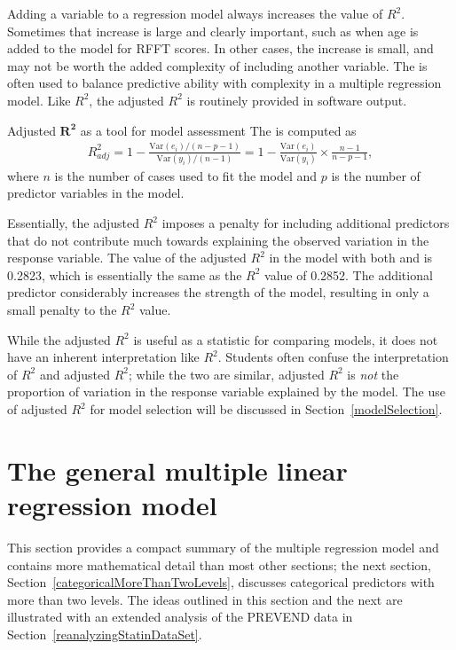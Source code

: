 Adding a variable to a regression model always increases the value of $R^2$. Sometimes that increase is large and clearly important, such as when age is added to the model for RFFT scores. In other cases, the increase is small, and may not be worth the added complexity of including another variable. The  is often used to balance predictive ability with complexity in a multiple regression model. Like $R^2$, the adjusted $R^2$ is routinely provided in software output. 

\begin{onebox}{Adjusted $\mathbf{R^2}$ as a tool for model assessment}
The  is computed as
\begin{align*}
R_{adj}^{2} = 1-\frac{\text{Var}(e_i) / (n-p-1)}{\text{Var}(y_i) / (n-1)}
	= 1-\frac{\text{Var}(e_i)}{\text{Var}(y_i)} \times
    \frac{n-1}{n-p-1},
\end{align*}
where $n$ is the number of cases used to fit the model and $p$ is the number of predictor variables in the model.
\end{onebox}

Essentially, the adjusted $R^2$ imposes a penalty for including additional predictors that do not contribute much towards explaining the observed variation in the response variable. The value of the adjusted $R^2$ in the model with both  and  is 0.2823, which is essentially the same as the $R^2$ value of 0.2852. The additional predictor  considerably increases the strength of the model, resulting in only a small penalty to the $R^2$ value.

While the adjusted $R^2$ is useful as a statistic for comparing models, it does not have an inherent interpretation like $R^2$. Students often confuse the interpretation of $R^2$ and adjusted $R^2$; while the two are similar, adjusted $R^2$ is \emph{not} the proportion of variation in the response variable explained by the model. The use of adjusted $R^2$ for model selection will be discussed in Section~\ref{modelSelection}.


\section{The general multiple linear regression model}
\label{generalMultipleRegression}
 
This section provides a compact summary of the multiple regression model and contains more mathematical detail than most other sections; the next section, Section~\ref{categoricalMoreThanTwoLevels}, discusses categorical predictors with more than two levels. The ideas outlined in this section and the next are illustrated with an extended analysis of the PREVEND data in Section~\ref{reanalyzingStatinDataSet}. 
 
